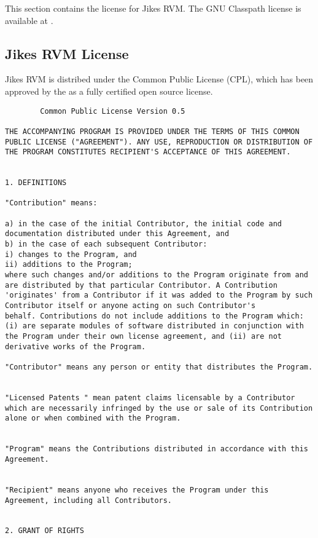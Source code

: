 This section contains the license for Jikes\TMweb{} RVM.\@
The GNU Classpath license is available
at \xlink{{\tt \classpathURL}}{\classpathURL}.  

%
%
\subsection{Jikes RVM License}
Jikes\TMweb{} RVM is distribed under the Common Public License (CPL),
which has been approved by the 
as a fully certified open source license.

%
%
\begin{verbatim}
		Common Public License Version 0.5 

THE ACCOMPANYING PROGRAM IS PROVIDED UNDER THE TERMS OF THIS COMMON
PUBLIC LICENSE ("AGREEMENT"). ANY USE, REPRODUCTION OR DISTRIBUTION OF
THE PROGRAM CONSTITUTES RECIPIENT'S ACCEPTANCE OF THIS AGREEMENT.


1. DEFINITIONS 

"Contribution" means: 

a) in the case of the initial Contributor, the initial code and
documentation distributed under this Agreement, and  
b) in the case of each subsequent Contributor:
i) changes to the Program, and
ii) additions to the Program;
where such changes and/or additions to the Program originate from and
are distributed by that particular Contributor. A Contribution
'originates' from a Contributor if it was added to the Program by such
Contributor itself or anyone acting on such Contributor's
behalf. Contributions do not include additions to the Program which:
(i) are separate modules of software distributed in conjunction with
the Program under their own license agreement, and (ii) are not
derivative works of the Program. 

"Contributor" means any person or entity that distributes the Program. 


"Licensed Patents " mean patent claims licensable by a Contributor
which are necessarily infringed by the use or sale of its Contribution
alone or when combined with the Program.  


"Program" means the Contributions distributed in accordance with this
Agreement.  


"Recipient" means anyone who receives the Program under this
Agreement, including all Contributors.  


2. GRANT OF RIGHTS 


\end{verbatim}
